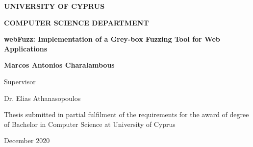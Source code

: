 \documentclass[12pt]{report}
\def\pname{webFuzz\xspace}
\def\ptitle{\pname: Implementation of a Grey-box Fuzzing Tool for Web Applications}
\begin{document}
\begin{titlepage}

\begin{center}
\LARGE{\textbf{\MakeUppercase{University of Cyprus}}}

\Large{\textbf{\MakeUppercase{Computer Science Department}}}

\vspace*{5cm}

\large{\textbf{\ptitle{}}}

\vspace*{0.5cm}

\large{\textbf{Marcos Antonios Charalambous}}

\vspace*{5cm}

\normalsize{Supervisor}

\normalsize{Dr. Elias Athanasopoulos}

\vspace*{3cm}

\normalsize{Thesis submitted in partial fulfilment of the requirements for the award of degree of Bachelor in Computer Science at University of Cyprus}

\vspace*{2cm}

\normalsize{December 2020}
\end{center}

\end{titlepage}


\setlength{\parindent}{0em}
\setlength{\parskip}{1.0em}



\newpage



\dominitoc
\tableofcontents
\listoffigures
\listoftables











\balance


\begin{appendices}
	\titlespacing*{\chapter}{0pt}{0pt}{0pt}
	
	
	\let\clearpage\relax
\end{appendices}
\end{document}
